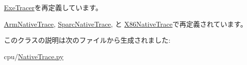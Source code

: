 \hyperlink{classExeTracer_1_1ExeTracer_acce15679d830831b0bbe8ebc2a60b2ca}{ExeTracer}を再定義しています。

\hyperlink{classArmNativeTrace_1_1ArmNativeTrace_acce15679d830831b0bbe8ebc2a60b2ca}{ArmNativeTrace}, \hyperlink{classSparcNativeTrace_1_1SparcNativeTrace_acce15679d830831b0bbe8ebc2a60b2ca}{SparcNativeTrace}, と \hyperlink{classX86NativeTrace_1_1X86NativeTrace_acce15679d830831b0bbe8ebc2a60b2ca}{X86NativeTrace}で再定義されています。

このクラスの説明は次のファイルから生成されました:\begin{DoxyCompactItemize}
\item 
cpu/\hyperlink{NativeTrace_8py}{NativeTrace.py}\end{DoxyCompactItemize}
